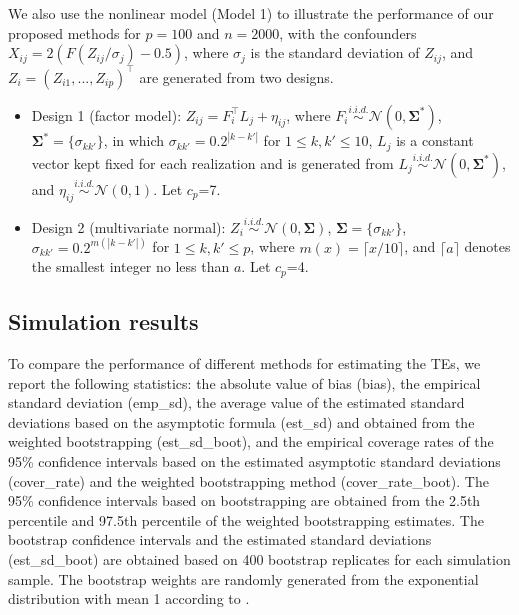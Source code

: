 \documentclass[11pt]{article}
\numberwithin{equation}{section}
\begin{document}
We also use the nonlinear model (Model 1) to illustrate the performance of our proposed methods for $p=100$ and $n=2000$, with the confounders $X_{ij} = 2(F(Z_{ij}/\sigma_j)-0.5)$, where $\sigma_j$ is the standard deviation of $Z_{ij}$, and $Z_{i}=(Z_{i1}, ...,Z_{ip})^\top$ are generated from two designs.
\begin{itemize}
	\item Design 1 (factor model):  $Z_{ij} = F_i^{\top}L_j + \eta_{ij}$, where $F_i \stackrel{i.i.d.}{\sim} \mathcal{N}\left( 0, \mathbf{\Sigma^*} \right)$, $\mathbf{\Sigma^*} = \{\sigma_{kk'} \}$, in which ${\sigma_{kk'}=0.2^{|k-k'|}}$ for $1\leq k, k' \leq 10$, $L_j$ is a constant vector kept fixed for each realization and is generated from $L_j \stackrel{i.i.d.}{\sim} \mathcal{N}\left( 0, \mathbf{\Sigma^*} \right)$, and $\eta_{ij} \stackrel{i.i.d.}{\sim} \mathcal{N}\left( 0, 1 \right)$. Let $c_p$=7.
	\item Design 2 (multivariate normal): $Z_{i} \stackrel{i.i.d.}{\sim} \mathcal{N}\left( 0, \mathbf{\Sigma} \right)$, $\mathbf{\Sigma} = \{\sigma_{kk'} \}$, ${\sigma_{kk'}=0.2^{m(|k-k'|)}}$ for $1\leq k, k' \leq p$, where $m(x) = \lceil x/10 \rceil$, and $\lceil a \rceil$ denotes the smallest integer no less than $a$.  Let $c_p$=4.
\end{itemize}


\subsection{Simulation results} \label{simulationresults}

To compare the performance of different methods for estimating the TEs, we report the following statistics: the absolute value of bias (bias), the empirical standard deviation (emp\_sd), the average value of the estimated  standard deviations based on the asymptotic formula (est\_sd) and obtained from the weighted bootstrapping (est\_sd\_boot), and the empirical coverage rates of the 95\% confidence intervals based on the estimated asymptotic standard deviations (cover\_rate) and the weighted bootstrapping method (cover\_rate\_boot). The 95\% confidence intervals based on bootstrapping are obtained from the 2.5th percentile and 97.5th percentile of the weighted bootstrapping estimates. The bootstrap confidence intervals and the estimated standard deviations (est\_sd\_boot) are obtained based on 400 bootstrap replicates for each simulation sample. The bootstrap weights are randomly generated from the exponential distribution with mean 1 according to \cite{makosorok2005bootstrap}.
\end{document}
